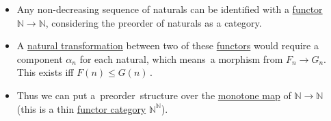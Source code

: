 \begin{itemize}
    \item  Any non-decreasing sequence of naturals can be identified with a \href{doc/1 math/Seven Sketches in Compositionality/Chapter 3: Databases/3 Functors, natural transformations, and databases/2 Functors/1 Functor}{functor} $\mathbb{N}\rightarrow \mathbb{N}$, considering the preorder of naturals as a category.
    \item A \href{doc/1 math/Seven Sketches in Compositionality/Chapter 3: Databases/3 Functors, natural transformations, and databases/4 Natural transformations/1 Natural transformation}{natural transformation} between two of these \href{doc/1 math/Seven Sketches in Compositionality/Chapter 3: Databases/3 Functors, natural transformations, and databases/2 Functors/1 Functor}{functors} would require a component $\alpha_n$ for each natural, which means \,a morphism from $F_n \rightarrow G_n$. This exists iff $F(n)\leq G(n)$\,.
    \item Thus we can put a \,preorder\, structure over the \href{doc/1 math/Seven Sketches in Compositionality/Chapter 1: Generative Effects/4 Monotone maps/1 Monotone map}{monotone map} of $\mathbb{N} \rightarrow \mathbb{N}$ (this is a thin \href{doc/1 math/Seven Sketches in Compositionality/Chapter 3: Databases/3 Functors, natural transformations, and databases/4 Natural transformations/3 Functor category}{functor category} $\mathbb{N}^\mathbb{N}$).
  \end{itemize}
